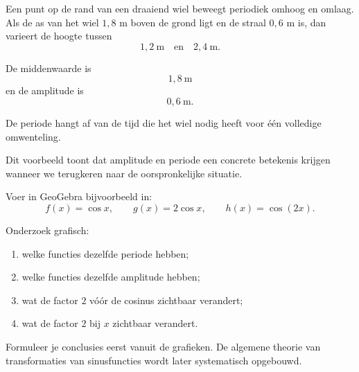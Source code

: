 \documentclass{ximera}
\begin{document}

Een punt op de rand van een draaiend wiel beweegt periodiek omhoog en omlaag.
Als de as van het wiel \(1{,}8\) m boven de grond ligt en de straal \(0{,}6\) m is,
dan varieert de hoogte tussen
\[
1{,}2\ \mathrm{m}
\quad\text{en}\quad
2{,}4\ \mathrm{m}.
\]

De middenwaarde is
\[
1{,}8\ \mathrm{m}
\]
en de amplitude is
\[
0{,}6\ \mathrm{m}.
\]

De periode hangt af van de tijd die het wiel nodig heeft voor één volledige
omwenteling.

Dit voorbeeld toont dat amplitude en periode een concrete betekenis krijgen
wanneer we terugkeren naar de oorspronkelijke situatie.

\begin{geogebra}
Voer in GeoGebra bijvoorbeeld in:
\[
f(x)=\cos x,
\qquad
g(x)=2\cos x,
\qquad
h(x)=\cos(2x).
\]

Onderzoek grafisch:
\begin{enumerate}
  \item welke functies dezelfde periode hebben;
  \item welke functies dezelfde amplitude hebben;
  \item wat de factor \(2\) vóór de cosinus zichtbaar verandert;
  \item wat de factor \(2\) bij \(x\) zichtbaar verandert.
\end{enumerate}

Formuleer je conclusies eerst vanuit de grafieken. De algemene theorie van
transformaties van sinusfuncties wordt later systematisch opgebouwd.
\end{geogebra}
\end{document}

